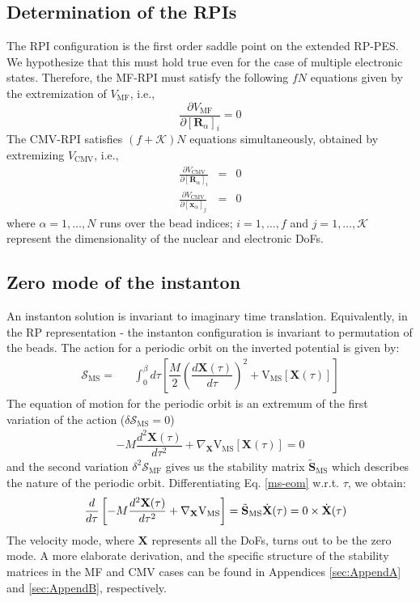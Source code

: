 \documentclass[%
 aip,
 jmp,%
 amsmath,amssymb,
reprint,%
]{revtex4-1}
\begin{document}
\subsection{\label{ssec:level2C} Determination of the RPIs}
The RPI configuration is the first order saddle point on the extended RP-PES\cite{Richardson2009}. We hypothesize that this must hold true even for the case of multiple electronic states. Therefore, the MF-RPI must satisfy the following $fN$ equations given by the extremization of $V_{\mathrm{MF}}$, i.e., 
\begin{equation}
\frac{\partial V_{\mathrm{MF}}}{\partial [\mathbf{R}_{\alpha}]_{i}} = 0 
\end{equation}
The CMV-RPI satisfies $(f+\mathcal{K})N$ equations simultaneously, obtained by extremizing $V_{\mathrm{CMV}}$, i.e.,
\begin{eqnarray}
\frac{\partial V_{\mathrm{CMV}}}{\partial [\mathbf{R}_{\alpha}]_{i}} & = & 0  \\
\frac{\partial V_{\mathrm{CMV}}}{\partial [\mathbf{x}_{\alpha}]_{j}} & = & 0 
\end{eqnarray}
where $\alpha=1,\dots,N$ runs over the bead indices; $i=1,\dots,f$ and $j=1,\dots, \mathcal{K}$ represent the dimensionality of the nuclear and electronic DoFs.
\subsection{\label{ssec:level2D} Zero mode of the instanton}
An instanton solution is invariant to imaginary time translation. Equivalently, in the RP representation - the instanton configuration is invariant to permutation of the beads. The action for a periodic orbit on the inverted potential is given by:
\begin{eqnarray}
\mathcal{S}_{\mathrm{MS}}  = && \int_{0}^{\beta} d\tau \left[ \dfrac{M}{2}\left( \dfrac{d \mathbf{X}(\tau)}{d\tau}\right)^2 + \mathrm{V_{MS}}[\mathbf{X}(\tau)]\right] 
\end{eqnarray}
The equation of motion for the periodic orbit is an extremum of the first variation of the action ($\delta \mathcal{S}_{\mathrm{MS}} = 0$) 
\begin{eqnarray}
- M \dfrac{d^2 \mathbf{X}(\tau)}{d\tau^2} + \nabla_{\mathbf{X}} \mathrm{V_{MS}}[\mathbf{X}(\tau)] = 0 \label{ms-eom} 
\end{eqnarray}
and the second variation $\delta^2 \mathcal{S}_{\mathrm{MF}}$ gives us the stability matrix $\tilde{\mathbf{S}}_{\mathrm{MS}}$ which describes the nature of the periodic orbit. Differentiating Eq. \eqref{ms-eom} w.r.t. $\tau$, we obtain:
\begin{eqnarray}
&& \dfrac{d}{d\tau} \left[ - M \dfrac{d^2 \mathbf{X}(\tau)}{d\tau^2} + \nabla_{\mathbf{X}}\mathrm{V_{MS}}  \right] =   \tilde{\mathbf{S}}_{\mathrm{MS}}\dot{\mathbf{X}}(\tau) = 0 \times \dot{\mathbf{X}}(\tau) \notag \\
\end{eqnarray}
The velocity mode, where $\mathbf{X}$ represents all the DoFs, turns out to be the zero mode. A more elaborate derivation, and the specific structure of the stability matrices in the MF and CMV cases can be found in Appendices \ref{sec:AppendA} and \ref{sec:AppendB}, respectively. 
\end{document}
